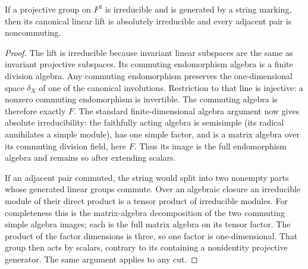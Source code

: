 \documentclass[11pt,a4paper]{article}
\begin{document}
\begin{lemma}\label{connected}
If a projective group on $F^3$ is irreducible and is generated by a string
marking, then its canonical linear lift is absolutely irreducible and every
adjacent pair is noncommuting.
\end{lemma}
\begin{proof}
The lift is irreducible because invariant linear subspaces are the same as
invariant projective subspaces. Its commuting endomorphism algebra is a finite
division algebra. Any commuting endomorphism preserves the one-dimensional
space $\delta_X$ of one of the canonical involutions. Restriction to that line
is injective: a nonzero commuting endomorphism is invertible. The commuting
algebra is therefore exactly $F$. The standard finite-dimensional algebra
argument now gives absolute irreducibility: the faithfully acting algebra is
semisimple (its radical annihilates a simple module), has one simple factor,
and is a matrix algebra over its commuting division field, here $F$.
Thus its image is the full endomorphism algebra and remains so after extending
scalars.

If an adjacent pair commuted, the string would split into two nonempty parts
whose generated linear groups commute. Over an algebraic closure an irreducible
module of their direct product is a tensor product of irreducible modules.
For completeness this is the matrix-algebra decomposition of the two commuting
simple algebra images; each is the full matrix algebra on its tensor factor.
The product of the factor dimensions is three, so one factor is one-dimensional.
That group then acts by scalars, contrary to its containing a nonidentity
projective generator. The same argument applies to any cut.
\end{proof}
\end{document}
